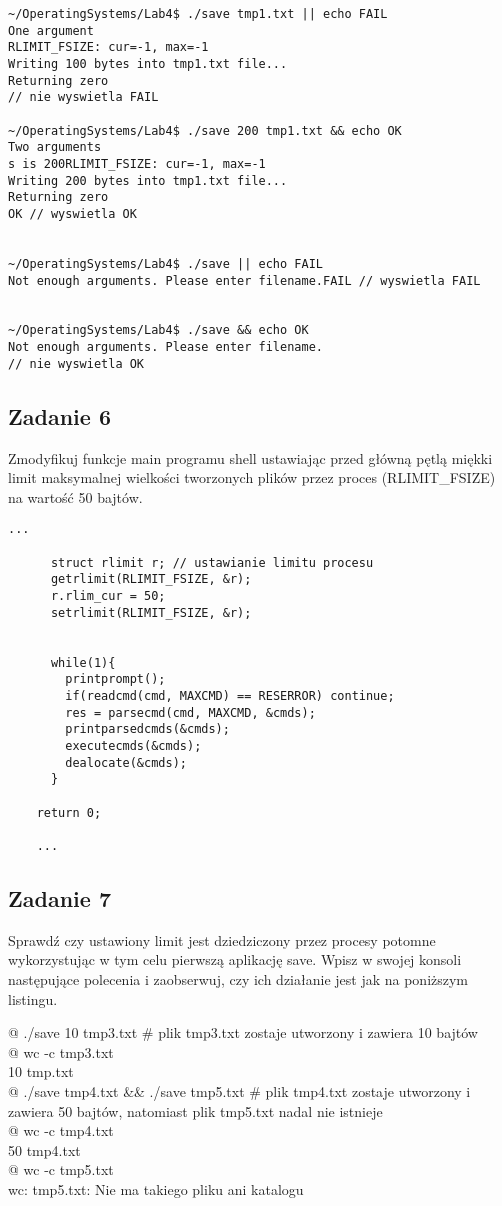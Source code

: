 \documentclass[a4paper,15pt]{article}
\newcommand{\assignment}[2]{
    \begin{tcolorbox}[colback=black!5!white,colframe=black,title={Zadanie #1}]
        #2
    \end{tcolorbox}
}
\begin{document}
\begin{lstlisting}[style=CStyle, label=some-code, caption=Testowanie działania save.c w przypadku wywołań z \&\& oraz ||]
~/OperatingSystems/Lab4$ ./save tmp1.txt || echo FAIL
One argument
RLIMIT_FSIZE: cur=-1, max=-1
Writing 100 bytes into tmp1.txt file...
Returning zero
// nie wyswietla FAIL

~/OperatingSystems/Lab4$ ./save 200 tmp1.txt && echo OK
Two arguments
s is 200RLIMIT_FSIZE: cur=-1, max=-1
Writing 200 bytes into tmp1.txt file...
Returning zero
OK // wyswietla OK


~/OperatingSystems/Lab4$ ./save || echo FAIL
Not enough arguments. Please enter filename.FAIL // wyswietla FAIL


~/OperatingSystems/Lab4$ ./save && echo OK
Not enough arguments. Please enter filename.
// nie wyswietla OK
\end{lstlisting}

\newpage
\subsection{Zadanie 6}
\assignment{6}{
Zmodyfikuj funkcje main programu shell ustawiając przed główną pętlą miękki limit maksymalnej wielkości tworzonych plików przez proces (RLIMIT\_FSIZE) na wartość 50 bajtów.
}
\begin{lstlisting}[style=CStyle, label=some-code, caption=plik shell.c - przed główną pętlą]
	...
	    	  
  	  struct rlimit r; // ustawianie limitu procesu
      getrlimit(RLIMIT_FSIZE, &r);
      r.rlim_cur = 50;
      setrlimit(RLIMIT_FSIZE, &r);


      while(1){
        printprompt();
        if(readcmd(cmd, MAXCMD) == RESERROR) continue;
        res = parsecmd(cmd, MAXCMD, &cmds);
        printparsedcmds(&cmds);
        executecmds(&cmds);
        dealocate(&cmds);
      }
     
	return 0;
	
	...
\end{lstlisting}

\newpage
\subsection{Zadanie 7}
\assignment{7}{
Sprawdź czy ustawiony limit jest dziedziczony przez procesy potomne wykorzystując w tym celu pierwszą aplikację save. Wpisz w swojej konsoli następujące polecenia i zaobserwuj, czy ich działanie jest jak na poniższym listingu.
\begin{framed}
@ ./save 10 tmp3.txt                    \# plik tmp3.txt zostaje utworzony i zawiera 10 bajtów \\
@ wc -c tmp3.txt \\
10 tmp.txt \\
@ ./save tmp4.txt \&\& ./save tmp5.txt   \# plik tmp4.txt zostaje utworzony i zawiera 50 bajtów, natomiast plik tmp5.txt nadal nie istnieje \\
@ wc -c tmp4.txt \\
50 tmp4.txt \\
@ wc -c tmp5.txt \\
wc: tmp5.txt: Nie ma takiego pliku ani katalogu 
\end{framed}
}
\end{document}
